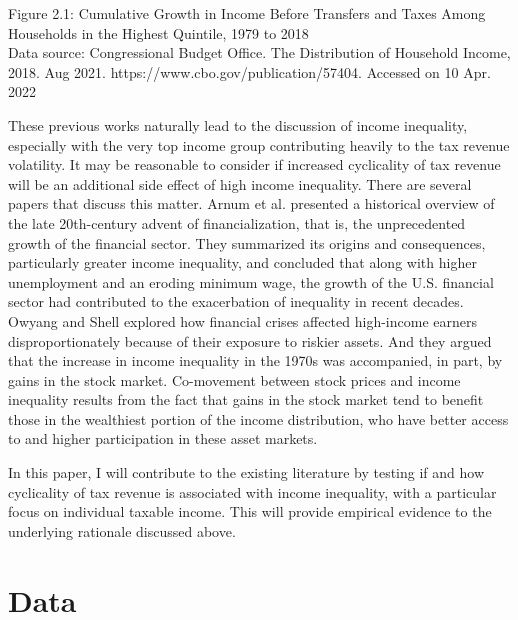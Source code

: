 \documentclass{article}
\begin{document}
\begin{center}
Figure 2.1: Cumulative Growth in Income Before Transfers and Taxes Among Households in the Highest Quintile, 1979 to 2018\\
\noindent
{}
\noindent Data source: Congressional Budget Office. The Distribution of Household Income, 2018. Aug 2021. https://www.cbo.gov/publication/57404. Accessed on 10 Apr. 2022
\end{center}

These previous works naturally lead to the discussion of income inequality, especially with the very top income group contributing heavily to the tax revenue volatility. It may be reasonable to consider if increased cyclicality of tax revenue will be an additional side effect of high income inequality. There are several papers that discuss this matter. Arnum et al. presented a historical overview of the late 20th-century advent of financialization, that is, the unprecedented growth of the financial sector. They summarized its origins and consequences, particularly greater income inequality, and concluded that along with higher unemployment and an eroding minimum wage, the growth of the U.S. financial sector had contributed to the exacerbation of inequality in recent decades. Owyang and Shell explored how financial crises affected high-income earners disproportionately because of their exposure to riskier assets. And they argued that the increase in income inequality in the 1970s was accompanied, in part, by gains in the stock market. Co-movement between stock prices and income inequality results from the fact that gains in the stock market tend to benefit those in the wealthiest portion of the income distribution, who have better access to and higher participation in these asset markets. 

In this paper, I will contribute to the existing literature by testing if and how cyclicality of tax revenue is associated with income inequality, with a particular focus on individual taxable income. This will provide empirical evidence to the underlying rationale discussed above. 








\vspace{2mm}
\section{Data}
\end{document}

